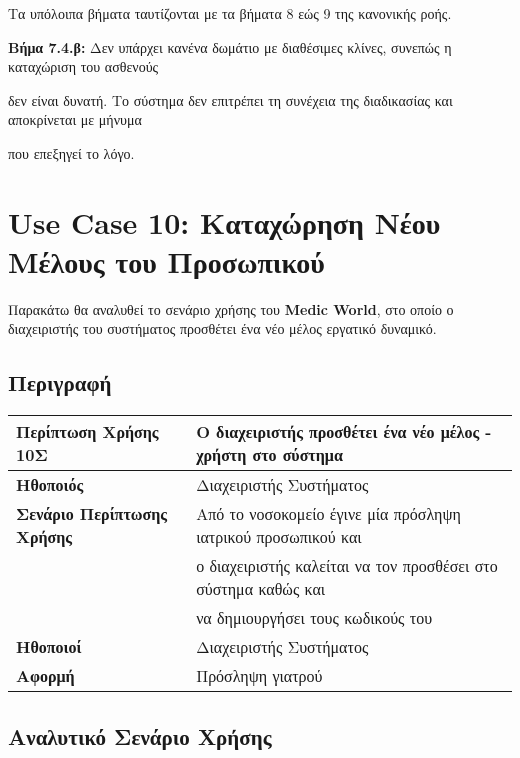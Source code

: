 \documentclass{article}
\newcommand\T{\rule{0pt}{2.6ex}}       %
\newcommand\B{\rule[-1.2ex]{0pt}{0pt}}
\begin{document}
Τα υπόλοιπα βήματα ταυτίζονται με τα βήματα 8 εώς 9 της κανονικής ροής. \vspace{0.2cm}

\par \textbf{Βήμα 7.4.β:} Δεν υπάρχει κανένα δωμάτιο με διαθέσιμες κλίνες, συνεπώς η καταχώριση του ασθενούς \par δεν είναι δυνατή. Το σύστημα δεν επιτρέπει τη συνέχεια της διαδικασίας και αποκρίνεται με μήνυμα \par που επεξηγεί το λόγο.\vspace{0.1cm}


 \section{Use Case 10: Καταχώρηση Νέου Μέλους του Προσωπικού}

Παρακάτω θα αναλυθεί το σενάριο χρήσης του \textbf{Medic World}, στο οποίο ο διαχειριστής του συστήματος προσθέτει ένα νέο μέλος εργατικό δυναμικό.

\subsection{Περιγραφή}

\begin{center}
     \begin{tabular}{|l|l|}
     \hline
      \textbf{Περίπτωση Χρήσης 10Σ} & Ο διαχειριστής προσθέτει ένα νέο μέλος - χρήστη στο σύστημα \T\B \\ 
      \hline
      \textbf{Ηθοποιός} & Διαχειριστής Συστήματος \T\B \\
      \hline
      \textbf{Σενάριο Περίπτωσης Χρήσης} & Από το νοσοκομείο έγινε μία πρόσληψη ιατρικού προσωπικού και \T \\& ο διαχειριστής καλείται να τον προσθέσει στο σύστημα καθώς και \\& να δημιουργήσει τους κωδικούς του \B \\
      \hline
      \textbf{Ηθοποιοί} & Διαχειριστής Συστήματος \T\B \\
      \hline
      \textbf{Αφορμή} & Πρόσληψη γιατρού \T\B \\
      \hline
     \end{tabular}
 \end{center}
 
  \subsection{Αναλυτικό Σενάριο Χρήσης}
\end{document}
